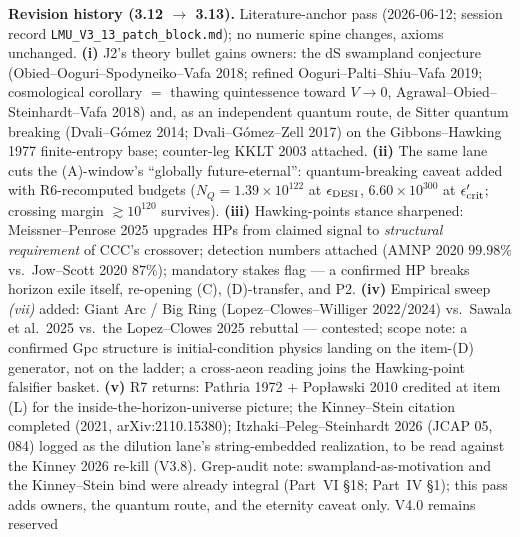 \documentclass[11pt]{article}
\begin{document}
{\medskip
\noindent\textbf{Revision history (3.12 $\to$ 3.13).} Literature-anchor pass (2026-06-12; session record \texttt{LMU\_V3\_13\_patch\_block.md}); no numeric spine changes, axioms unchanged. \textbf{(i)} J2's theory bullet gains owners: the dS swampland conjecture (Obied--Ooguri--Spodyneiko--Vafa 2018; refined Ooguri--Palti--Shiu--Vafa 2019; cosmological corollary $=$ thawing quintessence toward $V\to0$, Agrawal--Obied--Steinhardt--Vafa 2018) and, as an independent quantum route, de Sitter quantum breaking (Dvali--G\'omez 2014; Dvali--G\'omez--Zell 2017) on the Gibbons--Hawking 1977 finite-entropy base; counter-leg KKLT 2003 attached. \textbf{(ii)} The same lane cuts the (A)-window's ``globally future-eternal'': quantum-breaking caveat added with R6-recomputed budgets ($N_Q=1.39\times10^{122}$ at $\epsilon_{\rm DESI}$, $6.60\times10^{300}$ at $\epsilon'_{\rm crit}$; crossing margin $\gtrsim10^{120}$ survives). \textbf{(iii)} Hawking-points stance sharpened: Meissner--Penrose 2025 upgrades HPs from claimed signal to \emph{structural requirement} of CCC's crossover; detection numbers attached (AMNP 2020 $99.98\%$ vs.\ Jow--Scott 2020 $87\%$); mandatory stakes flag --- a confirmed HP breaks horizon exile itself, re-opening (C), (D)-transfer, and P2. \textbf{(iv)} Empirical sweep \emph{(vii)} added: Giant Arc / Big Ring (Lopez--Clowes--Williger 2022/2024) vs.\ Sawala et al.\ 2025 vs.\ the Lopez--Clowes 2025 rebuttal --- contested; scope note: a confirmed Gpc structure is initial-condition physics landing on the item-(D) generator, not on the ladder; a cross-aeon reading joins the Hawking-point falsifier basket. \textbf{(v)} R7 returns: Pathria 1972 $+$ Pop\l awski 2010 credited at item (L) for the inside-the-horizon-universe picture; the Kinney--Stein citation completed (2021, arXiv:2110.15380); Itzhaki--Peleg--Steinhardt 2026 (JCAP 05, 084) logged as the dilution lane's string-embedded realization, to be read against the Kinney 2026 re-kill (V3.8). Grep-audit note: swampland-as-motivation and the Kinney--Stein bind were already integral (Part~VI \S18; Part~IV \S1); this pass adds owners, the quantum route, and the eternity caveat only. V4.0 remains reserved

}
\end{document}
